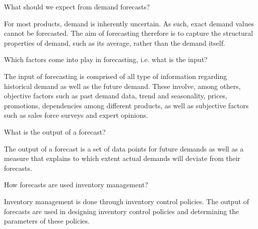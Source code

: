 \begin{question}
What should we expect from demand forecasts?

\end{question}

  \begin{solution}
	For most products, demand is inherently uncertain. As such, exact demand values cannot be forecasted. The aim of forecasting therefore is to capture the structural properties of demand, such as its average, rather than the demand itself.  
	

  \end{solution}

\begin{question}
Which factors come into play in forecasting, i.e. what is the input?

\end{question}

  \begin{solution}
    The input of forecasting is comprised of all type of information regarding historical demand as well as the future demand. These involve, among others, objective factors such as past demand data, trend and seasonality, prices, promotions, dependencies among different products, as well as subjective factors such as sales force surveys and expert opinions.     
  \end{solution}


\begin{question}
What is the output of a forecast?

\end{question}

  \begin{solution}
    The output of a forecast is a set of data points for future demands as well as a measure that explains to which extent actual demands will deviate from their forecasts.
  \end{solution}


\begin{question}
How forecasts are used inventory management?

\end{question}

  \begin{solution}
	Inventory management is done through inventory control policies. The output of forecasts are used in designing inventory control policies and determining the parameters of these policies.
  \end{solution}


